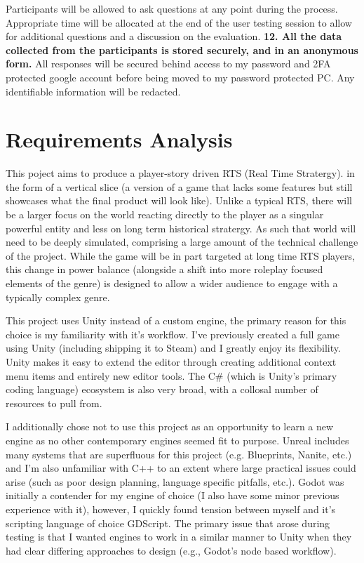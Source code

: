 \documentclass{report}
\begin{document}
\begin{raggedright}
\newline
\newline
Participants will be allowed to ask questions at any point during the process. Appropriate time will be allocated at the end of the user testing session to allow for additional questions and a discussion on the evaluation.
\newline
\newline
\textbf{12. All the data collected from the participants is stored securely, and in an
anonymous form.}
\newline
\newline
All responses will be secured behind access to my password and 2FA protected google account before being moved to my password protected PC. Any identifiable information will be redacted.
\end{raggedright}

\chapter{Requirements Analysis}

This poject aims to produce a player-story driven RTS (Real Time Stratergy). in the form of a vertical slice (a version of a game that lacks some features but still showcases what the final product will look like). Unlike a typical RTS, there will be a larger focus on the world reacting directly to the player as a singular powerful entity and less on long term historical stratergy. As such that world will need to be deeply simulated, comprising a large amount of the technical challenge of the project.
While the game will be in part targeted at long time RTS players, this change in power balance (alongside a shift into more roleplay focused elements of the genre) is designed to allow a wider audience to engage with a typically complex genre. 

This project uses Unity instead of a custom engine, the primary reason for this choice is my familiarity with it's workflow. I've previously created a full game using Unity (including shipping it to Steam) and I greatly enjoy its flexibility. Unity makes it easy to extend the editor through creating additional context menu items and entirely new editor tools. 
The C\# (which is Unity's primary coding language) ecosystem is also very broad, with a collosal number of resources to pull from. 

I additionally chose not to use this project as an opportunity to learn a new engine as no other contemporary engines seemed fit to purpose. Unreal includes many systems that are superfluous for this project (e.g. Blueprints, Nanite, etc.) and I'm also unfamiliar with C++ to an extent where large practical issues could arise (such as poor design planning, language specific pitfalls, etc.). Godot was initially a contender for my engine of choice (I also have some minor previous experience with it), however, I quickly found tension between myself and it's scripting language of choice GDScript. The primary issue that arose during testing is that I wanted engines to work in a similar manner to Unity when they had clear differing approaches to design (e.g., Godot's node based workflow).
\end{document}
